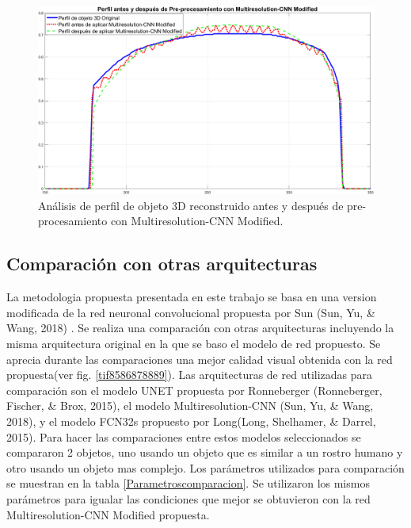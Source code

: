 \documentclass[10pt,letterpaper]{article}
\begin{document}
\begin{figure}[H]
	\centering
    \includegraphics[width=1\textwidth]{tifs/tif84.png}
    \caption{Análisis de perfil de objeto 3D reconstruido antes y después de pre-procesamiento con Multiresolution-CNN Modified.}
    \label{tif84}
\end{figure}

\subsection{Comparación con otras arquitecturas}
La metodologia propuesta presentada en este trabajo se basa en una version modificada de la red neuronal convolucional propuesta por Sun (Sun, Yu, \& Wang, 2018) \cite{Sun:Yu}. Se realiza una comparación con otras arquitecturas incluyendo la misma arquitectura original en la que se baso el modelo de red propuesto. Se aprecia durante las comparaciones una mejor calidad visual obtenida con la red propuesta(ver fig. \ref{tif8586878889}). Las arquitecturas de red utilizadas para comparación son el modelo UNET propuesta por Ronneberger (Ronneberger, Fischer, \& Brox, 2015)\cite{Ronn:Fisc}, el modelo Multiresolution-CNN (Sun, Yu, \& Wang, 2018)\cite{Sun:Yu}, y el modelo FCN32s propuesto por Long(Long, Shelhamer, \& Darrel, 2015)\cite{Long:Shel}. Para hacer las comparaciones entre estos modelos seleccionados se compararon 2 objetos, uno usando un objeto que es similar a un rostro humano y otro usando un objeto mas complejo. Los parámetros utilizados para comparación se muestran en la tabla \ref{Parametroscomparacion}. Se utilizaron los mismos parámetros para igualar las condiciones que mejor se obtuvieron con la red Multiresolution-CNN Modified propuesta. %

\end{document}
